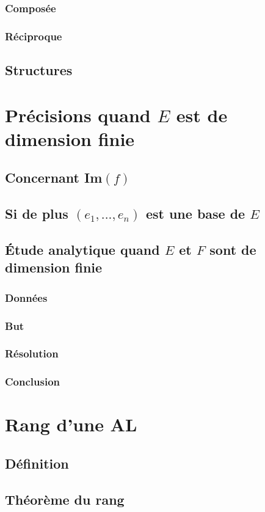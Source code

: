\documentclass[12pt,a4paper,french]{book}
\begin{document}
			\subsubsection{Composée}
			\subsubsection{Réciproque}
		\subsection{Structures}
	\section{Précisions quand $E$ est de dimension finie}
		\subsection{Concernant Im$(f)$}
		\subsection{Si de plus $(e_1,...,e_n)$ est une base de $E$}
		\subsection{Étude analytique quand $E$ et $F$ sont de dimension finie}
			\subsubsection{Données}
			\subsubsection{But}
			\subsubsection{Résolution}
			\subsubsection{Conclusion}
	\section{Rang d'une AL}
		\subsection{Définition}
		\subsection{Théorème du rang}
\end{document}
